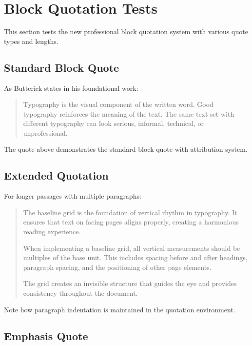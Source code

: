 \documentclass[11pt,a4paper]{article}
\begin{document}
\showgrid

\section{Block Quotation Tests}

This section tests the new professional block quotation system with various quote types and lengths.

\subsection{Standard Block Quote}

As Butterick states in his foundational work:
\begin{quote}
Typography is the visual component of the written word. Good typography reinforces the meaning of the text. The same text set with different typography can look serious, informal, technical, or unprofessional.
\end{quote}

The quote above demonstrates the standard block quote with attribution system.

\subsection{Extended Quotation}

For longer passages with multiple paragraphs:
\begin{quotation}
The baseline grid is the foundation of vertical rhythm in typography. It ensures that text on facing pages aligns properly, creating a harmonious reading experience.

When implementing a baseline grid, all vertical measurements should be multiples of the base unit. This includes spacing before and after headings, paragraph spacing, and the positioning of other page elements.

The grid creates an invisible structure that guides the eye and provides consistency throughout the document.
\end{quotation}

Note how paragraph indentation is maintained in the quotation environment.

\subsection{Emphasis Quote}
\end{document}

